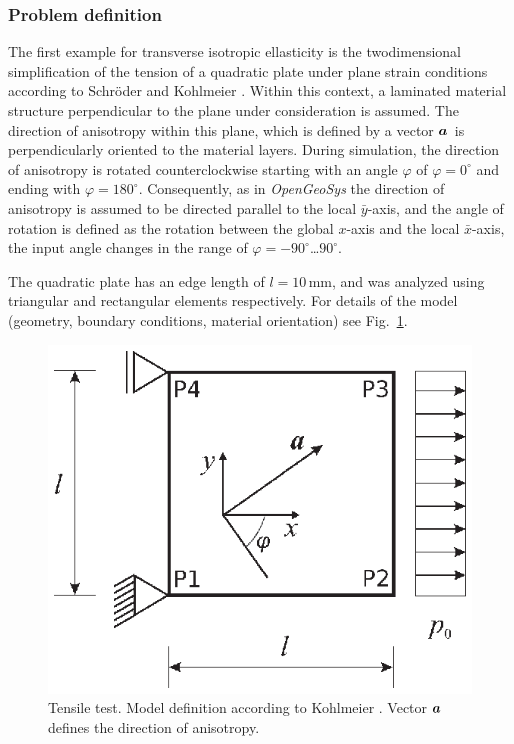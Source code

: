 \subsubsection*{Problem definition}

The first example for transverse isotropic ellasticity is the twodimensional simplification of the tension of a quadratic plate under plane strain conditions according to Schr\"oder \cite{Schroeder:1996} and Kohlmeier \cite{Kohlmeier:2006}. Within this context, a laminated material structure perpendicular to the plane under consideration is assumed. The direction of anisotropy within this plane, which is defined by a vector $\mbox{${\mbox{\boldmath${a}$\unboldmath}}_{\:\!}$}$ is perpendicularly oriented to the material layers. During simulation, the direction of anisotropy is rotated counterclockwise starting with an angle $\varphi$ of $\varphi=0^{\circ}$ and ending with $\varphi=180^{\circ}$. Consequently, as in {\sl OpenGeoSys} the direction of anisotropy is assumed to be directed parallel to the local $\bar{y}$-axis, and the angle of rotation is defined as the rotation between the global $x$-axis and the local $\bar{x}$-axis, the input angle changes in the range of $\varphi=-90^{\circ}$\dots$90^{\circ}$.

The quadratic plate has an edge length of $l=10\,$mm, and was analyzed using triangular and rectangular elements respectively. For details of the model (geometry, boundary conditions, material orientation) see Fig.~\ref{tens_transiso_model_2d}.

\begin{figure}[!htb]
\begin{center}
\includegraphics[scale=0.75]{M/figure/tenstest_model_mod.eps}
\end{center}
\caption{Tensile test. Model definition according to Kohlmeier \cite{Kohlmeier:2006}. Vector $\mbox{${\mbox{\boldmath${a}$\unboldmath}}_{\:\!}$}$ defines the direction of anisotropy.}
\label{tens_transiso_model_2d}
\end{figure}

